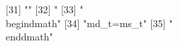  [31] ""                                                                                                                                                                                                                                                                                                                                                                                                                                                                                                                                                                                                                                             
 [32] "%
 [33] "\\begin{dmath}"                                                                                                                                                                                                                                                                                                                                                                                                                                                                                                                                                                                                                               
 [34] "{md_{t}}={ms_{t}}"                                                                                                                                                                                                                                                                                                                                                                                                                                                                                                                                                                                                                            
 [35] "\\end{dmath}"                                                                                                                                                                                                                                                                                                                                                                                                                                                                                                                                                                                                                                 
